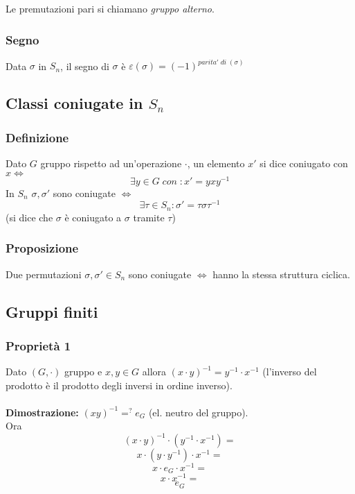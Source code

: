 Le premutazioni pari si chiamano \textit{gruppo alterno}.

\subsubsection{Segno}

Data \(\sigma\) in \(S_n\), il segno di \(\sigma\) è \(\varepsilon (\sigma)=(-1)^{parita'\;di\;(\sigma)}\)

\subsection{Classi coniugate in \(S_n\)}

\subsubsection{Definizione}
Dato \(G\) gruppo rispetto ad un'operazione \(\cdot\), un elemento \(x'\) si dice coniugato con \(x\Leftrightarrow\)
\[\exists y\in G\;con\;:x'=yxy^{-1}\] 
In \(S_n\) \(\sigma ,\sigma '\) sono coniugate \(\Leftrightarrow\)
\[\exists\tau\in S_n: \sigma '=\tau\sigma\tau ^{-1}\]
(si dice che \(\sigma\) è coniugato a \(\sigma\) tramite \(\tau\)) %

\subsubsection{Proposizione}
Due permutazioni \(\sigma, \sigma '\in S_n\) sono coniugate \(\Leftrightarrow\) hanno la stessa struttura ciclica.

\subsection{Gruppi finiti}

\subsubsection{Proprietà 1}

Dato \((G,\cdot)\) gruppo e \(x,y\in G\) allora \((x\cdot y)^{-1}=y^{-1}\cdot x^{-1}\) (l'inverso del prodotto è il prodotto degli inversi in ordine inverso).
\\\\
\textbf{Dimostrazione:} \((xy)^{-1}=^? e_G\) (el. neutro del gruppo).
\\Ora 
\[(x\cdot y)^{-1}\cdot (y^{-1}\cdot x^{-1})=\]
\[x\cdot (y\cdot y^{-1})\cdot x^{-1}=\]
\[x\cdot e_G\cdot x^{-1}=\]
\[x\cdot x^{-1}=\]
\[e_G\]

